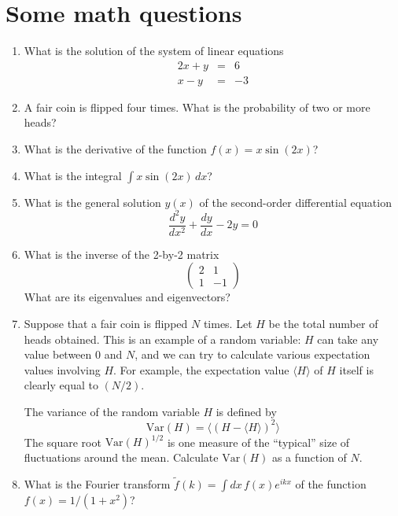 \documentclass[aps,prd,superscriptaddress,groupedaddress,nofootinbib,nobibnotes]{revtex4}
\newcommand{\be}{\begin{equation}}
\newcommand{\ee}{\end{equation}}
\newcommand{\ba}{\begin{eqnarray}}
\newcommand{\ea}{\end{eqnarray}}
\newcommand{\nn}{\nonumber}
\def\Var{\mbox{Var}}
\begin{document}




\section{Some math questions}

\begin{enumerate}
\item What is the solution of the system of linear equations
\ba
2x + y &=& 6 \nn \\
x - y &=& -3
\ea
\item A fair coin is flipped four times.  What is the probability of two or more heads?
\item What is the derivative of the function $f(x) = x \sin(2x)$?
\item What is the integral $\int x \sin(2x) \, dx$?
\item What is the general solution $y(x)$ of the second-order differential equation
\be
\frac{d^2y}{dx^2} + \frac{dy}{dx} - 2 y = 0
\ee
\item What is the inverse of the 2-by-2 matrix
\be
\left( \begin{array}{cc}
  2 & 1 \\
  1 & -1
\end{array} \right)
\ee
What are its eigenvalues and eigenvectors?
\item Suppose that a fair coin is flipped $N$ times.  Let $H$ be the total number of heads obtained.
This is an example of a random variable: $H$ can take any value between 0 and $N$,
and we can try to calculate various expectation values involving $H$.  For example, the expectation value 
$\langle H \rangle$ of $H$ itself is clearly equal to $(N/2)$.

The variance of the random variable $H$ is defined by
\be
\Var(H) = \Big\langle (H - \langle H \rangle)^2 \Big\rangle
\ee
The square root $\Var(H)^{1/2}$ is one measure of the ``typical'' size of fluctuations around the mean.
Calculate $\Var(H)$ as a function of $N$.

\item What is the Fourier transform $\tilde f(k) = \int dx \, f(x) e^{ikx}$ of the function $f(x) = 1/(1+x^2)$?
\end{enumerate}
\end{document}

